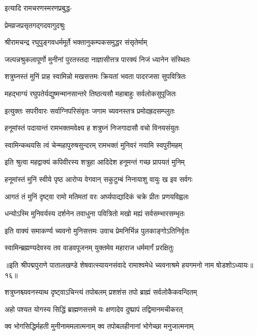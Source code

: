 इत्यादि रामचरणस्मरणप्रबुद्ध-

प्रेमव्रजप्रसृतगद्गदवागुदश्रुः

\twolineshloka
{श्रीरामचन्द्र रघुपुङ्गवधर्ममूर्ते}
{भक्तानुकम्पकसमुद्धर संसृतेर्माम्}%

\twolineshloka
{जल्पन्नश्रुकलापूर्णो मुनीनां पुरतस्तदा}
{नाज्ञासीत्तत्र पारक्यं निजं ध्यानेन संस्थितः}%

\twolineshloka
{शत्रुघ्नस्तं मुनिं प्राह स्वामिन्नो मखसत्तमः}
{क्रियतां भवता पादरजसा सुपवित्रितः}%

\twolineshloka
{महद्भाग्यं रघुपतेर्यद्युष्मन्मानसान्तरे}
{तिष्ठत्यसौ महाबाहुः सर्वलोकसुपूजितः}%

\twolineshloka
{इत्युक्तः सपरीवारः सर्वाग्निपरिसंवृतः}
{जगाम च्यवनस्तत्र प्रमोदह्रदसम्प्लुतः}%

\twolineshloka
{हनूमांस्तं पदायान्तं रामभक्तमवेक्ष्य ह}
{शत्रुघ्नं निजगादासौ वचो विनयसंयुतः}%

\twolineshloka
{स्वामिन्कथयसि त्वं चेन्महापुरुषसुन्दरम्}
{रामभक्तं मुनिवरं नयामि स्वपुरीमहम्}%

\twolineshloka
{इति श्रुत्वा महद्वाक्यं कपिवीरस्य शत्रुहा}
{आदिदेश हनूमन्तं गच्छ प्रापयतं मुनिम्}%

\twolineshloka
{हनूमांस्तं मुनिं स्वीये पृष्ठ आरोप्य वेगवान्}
{सकुटुम्बं निनायाशु वायुः ख इव सर्वगः}%

\twolineshloka
{आगतं तं मुनिं दृष्ट्वा रामो मतिमतां वरः}
{अर्घ्यपाद्यादिकं चक्रे प्रीतः प्रणयविह्वलः}%

\twolineshloka
{धन्योऽस्मि मुनिवर्यस्य दर्शनेन तवाधुना}
{पवित्रितो मखो मह्यं सर्वसम्भारसम्भृतः}%

\twolineshloka
{इति वाक्यं समाकर्ण्य च्यवनो मुनिसत्तमः}
{उवाच प्रेमनिर्भिन्न पुलकाङ्गोऽतिनिर्वृतः}%

\twolineshloka
{स्वामिन्ब्रह्मण्यदेवस्य तव वाडवपूजनम्}
{युक्तमेव महाराज धर्ममार्गं प्ररक्षितुः}%

॥इति श्रीपद्मपुराणे पातालखण्डे शेषवात्स्यायनसंवादे रामाश्वमेधे च्यवनाश्रमे हयगमनो नाम षोडशोऽध्यायः॥१६॥



\twolineshloka
{शत्रुघ्नश्च्यवनस्याथ दृष्ट्वाऽचिन्त्यं तपोबलम्}
{प्रशशंस तपो ब्राह्मं सर्वलोकैकवन्दितम्}%

\twolineshloka
{अहो पश्यत योगस्य सिद्धिं ब्राह्मणसत्तमे}
{यः क्षणादेव दुष्प्रापं तद्विमानमचीकरत्}%

\twolineshloka
{क्व भोगसिद्धिर्महती मुनीनाममलात्मनाम्}
{क्व तपोबलहीनानां भोगेच्छा मनुजात्मनाम्}%

